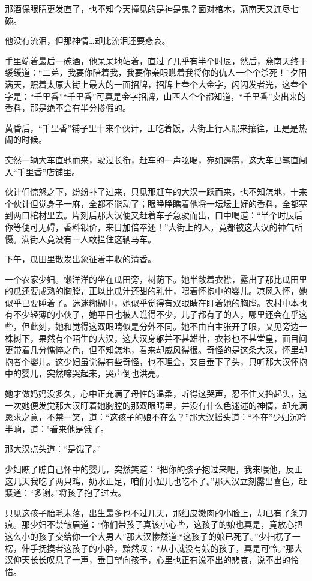 \documentclass[12pt,oneside]{book}
\begin{document}
那酒保眼睛更发直了，也不知今天撞见的是神是鬼？面对棺木，燕南天又连尽七碗。

他没有流泪，但那神情\ldots 却比流泪还要悲哀。

手里端着最后一碗酒，他呆呆地站着，直过了几乎有半个时辰，然后，燕南天终于缓缓道：``二弟，我要你陪着我，我要你亲眼瞧着我将你的仇人一个个杀死！''夕阳满天，照着太原大街上最大的一面招牌，招牌上叁个大金字，闪闪发者光，这叁个字是：``千里香''``千里香''可真是金字招牌，山西人个个都知道，``千里香''卖出来的香料，那是绝不会有半分掺假的。

黄昏后，``千里香''铺子里十来个伙计，正吃着饭，大街上行人熙来攘往，正是是热闹的时候。

突然一辆大车直驰而来，驶过长衔，赶车的一声吆喝，宛如霹雳，这大车已笔直闯入``千里香''店铺里。

伙计们惊怒之下，纷纷扑了过来，只见那赶车的大汉一跃而来，也不知怎地，十来个伙计但觉身子一麻，全都不能动了；眼睁睁瞧着他将一坛坛上好的香料，全都塞到两口棺材里去。片刻后那大汉便又赶着车子急驶而出，口中喝道：``半个时辰后你等便可无碍，香料银价，来日加倍奉还！''大街上的人，竟都被这大汉的神气所慑。满街人竟没有一人敢拦住这辆马车。

下午，瓜田里散发出象征着丰收的清香。

一个农家少妇。懒洋洋的坐在瓜田旁，树荫下。她半敞着衣襟，露出了那比瓜田里的瓜还要成熟的胸膛，正以比瓜汁还甜的乳什，喂着怀抱中的婴儿。凉风入怀，她似乎已要睡着了。迷迷糊糊中，她似乎觉得有双眼睛在盯着她的胸膛。农村中本也有不少轻薄的小伙子，她平日也被人瞧得不少，儿子都有了的人，哪里还会在乎这些，但此刻，她和觉得这双眼睛似是分外不同。她不由自主张开了眼，又见旁边一株树下，果然有个陌生的大汉，这大汉身躯并不甚雄壮，衣衫也不甚堂皇，面目间更带着几分憔悴之色，但不知怎地，看来却威风得很。奇怪的是这条大汉，怀里却抱者个婴儿。这少妇虽觉得有些奇怪，也不理会，又自垂下了头，只听那大汉怀抱中的婴儿，突然啼哭起来，哭声倒也洪亮。

她才做妈妈没多久，心中正充满了母性的温柔，听得这哭声，忍不住又抬起头，这一次她便发觉那大汉盯着她胸膛的那双眼睛里，并没有什么色迷述的神情，却充满恳求之意，不禁一笑，道：``这孩子的娘不在么？''那大汉摇头道：``不在''少妇沉吟半晌，道："看来他是饿了。

那大汉点头道：``是饿了。''

少妇瞧了瞧自己怀中的婴儿，突然笑道：``把你的孩子抱过来吧，我来喂他，反正这几天我吃了两只鸡，奶水正足，咱们小妞儿也吃不了。''那大汉立刻露出喜色，赶紧道：``多谢。''将孩子抱了过去。

只见这孩子胎毛未落，出生最多也不过几天，那细皮嫩肉的小脸上，却已有了条刀痕。那少妇不禁皱眉道：``你们带孩子真该小心些，这孩子的娘也真是，竟放心把这么小的孩子交给你一个大男人''那大汉惨然道:``这孩子的娘已死了。''少扫楞了一楞，伸手抚摸者这孩子的小脸，黯然叹：``从小就没有娘的孩子，真是可怜。''那大汉仰天长长叹息了一声，垂目望向孩予，心里也正有说不出的悲哀，说不出的怜惜。
\end{document}
